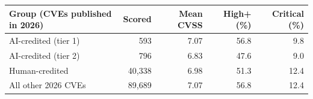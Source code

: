 \begin{tabular}{lrrrr}
\toprule
Group (CVEs published in 2026) & Scored & Mean CVSS & High+ (\%) & Critical (\%) \\
\midrule
AI-credited (tier 1) & 593 & 7.07 & 56.8 & 9.8 \\
AI-credited (tier 2) & 796 & 6.83 & 47.6 & 9.0 \\
Human-credited & 40,338 & 6.98 & 51.3 & 12.4 \\
All other 2026 CVEs & 89,689 & 7.07 & 56.8 & 12.4 \\
\bottomrule
\end{tabular}